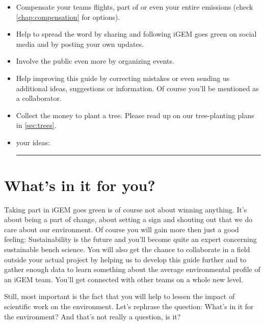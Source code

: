 {\begin{checklistbox}
\begin{itemize}
	\item Compensate your teams flights, part of or even your entire emissions (check \cref{chap:compensation} for options).
	\item Help to spread the word by sharing and following iGEM goes green on social media and by posting your own updates.
	\item Involve the public even more by organizing events.
	\item Help improving this guide by correcting mistakes or even sending us additional ideas, suggestions or information. Of course you'll be mentioned as a collaborator.
	\item Collect the money to plant a tree. Please read up on our tree-planting plans in \cref{sec:trees}.
	\item your ideas: {\leavevmode\leaders\hrule  height -1.9pt depth 2pt \hfill\kern0pt\relax}
\end{itemize}
\end{checklistbox}
}

\section{What's in it for you?}

Taking part in iGEM goes green is of course not about winning anything. It's about being a part of change, about setting a sign and shouting out that we do care about our environment. Of course you will gain more then just a good feeling: Sustainability is the future and you'll become quite an expert concerning sustainable bench science. You will also get the chance to collaborate in a field outside your actual project by helping us to develop this guide further and to gather enough data to learn something about the average environmental profile of an iGEM team. You'll get connected with other teams on a whole new level.

Still, most important is the fact that you will help to lessen the impact of scientific work on the environment. Let's rephrase the question: What's in it for the environment? And that's not really a question, is it?
